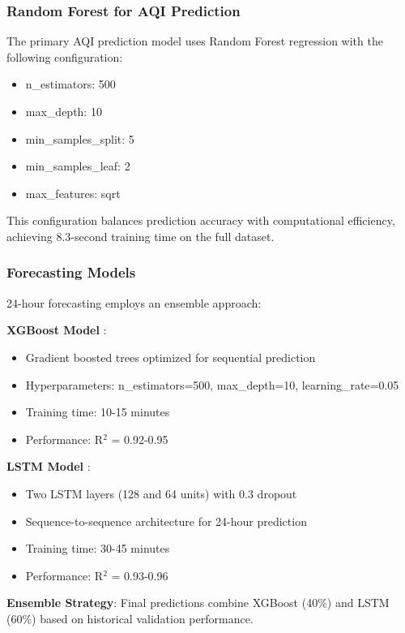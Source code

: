 \documentclass[12pt]{article}
\begin{document}
\subsubsection{Random Forest for AQI Prediction}

The primary AQI prediction model uses Random Forest regression with the following configuration:

\begin{itemize}
\item n\_estimators: 500
\item max\_depth: 10
\item min\_samples\_split: 5
\item min\_samples\_leaf: 2
\item max\_features: sqrt
\end{itemize}

This configuration balances prediction accuracy with computational efficiency, achieving 8.3-second training time on the full dataset.

\subsubsection{Forecasting Models}

24-hour forecasting employs an ensemble approach:

\textbf{XGBoost Model} \citep{chen2016xgboost}:
\begin{itemize}
\item Gradient boosted trees optimized for sequential prediction
\item Hyperparameters: n\_estimators=500, max\_depth=10, learning\_rate=0.05
\item Training time: 10-15 minutes
\item Performance: R$^2$ = 0.92-0.95
\end{itemize}

\textbf{LSTM Model} \citep{hochreiter1997long}:
\begin{itemize}
\item Two LSTM layers (128 and 64 units) with 0.3 dropout
\item Sequence-to-sequence architecture for 24-hour prediction
\item Training time: 30-45 minutes
\item Performance: R$^2$ = 0.93-0.96
\end{itemize}

\textbf{Ensemble Strategy}:
Final predictions combine XGBoost (40\%) and LSTM (60\%) based on historical validation performance.
\end{document}
